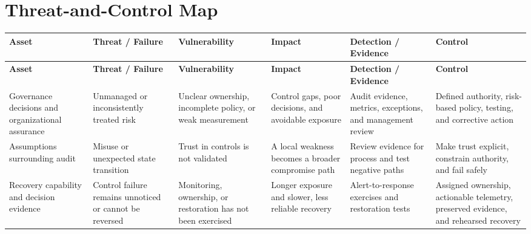 \documentclass[11pt,letterpaper]{article}
\begin{document}
\section*{Threat-and-Control Map}
\begingroup\scriptsize\setlength{\tabcolsep}{2pt}
\begin{longtable}{>{\raggedright\arraybackslash}p{}>{\raggedright\arraybackslash}p{}>{\raggedright\arraybackslash}p{}>{\raggedright\arraybackslash}p{}>{\raggedright\arraybackslash}p{}>{\raggedright\arraybackslash}p{}}
\toprule\rowcolor{Navy}\color{white}\textbf{Asset} & \color{white}\textbf{Threat / Failure} & \color{white}\textbf{Vulnerability} & \color{white}\textbf{Impact} & \color{white}\textbf{Detection / Evidence} & \color{white}\textbf{Control}\\\midrule
\endfirsthead
\toprule\rowcolor{Navy}\color{white}\textbf{Asset} & \color{white}\textbf{Threat / Failure} & \color{white}\textbf{Vulnerability} & \color{white}\textbf{Impact} & \color{white}\textbf{Detection / Evidence} & \color{white}\textbf{Control}\\\midrule
\endhead
Governance decisions and organizational assurance & Unmanaged or inconsistently treated risk & Unclear ownership, incomplete policy, or weak measurement & Control gaps, poor decisions, and avoidable exposure & Audit evidence, metrics, exceptions, and management review & Defined authority, risk-based policy, testing, and corrective action\\\midrule
Assumptions surrounding audit & Misuse or unexpected state transition & Trust in controls is not validated & A local weakness becomes a broader compromise path & Review evidence for process and test negative paths & Make trust explicit, constrain authority, and fail safely\\\midrule
Recovery capability and decision evidence & Control failure remains unnoticed or cannot be reversed & Monitoring, ownership, or restoration has not been exercised & Longer exposure and slower, less reliable recovery & Alert-to-response exercises and restoration tests & Assigned ownership, actionable telemetry, preserved evidence, and rehearsed recovery\\\midrule
\bottomrule
\end{longtable}
\endgroup
\end{document}
